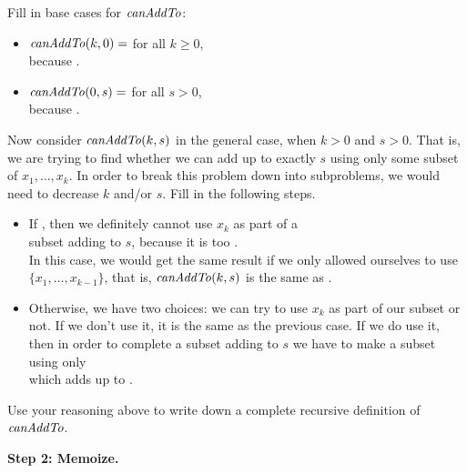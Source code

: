\documentclass{tufte-handout}
\begin{document}
\begin{questions}
  \item Fill in base cases for $\mathit{canAddTo}$:
    \begin{itemize}
    \item $\mathit{canAddTo}(k,0) = $ \blank for all $k \geq 0$, \\ because
      \blank.
    \item $\mathit{canAddTo}(0,s) = $ \blank for all $s > 0$, \\ because \blank.
    \end{itemize}
  \item Now consider $\mathit{canAddTo}(k,s)$ in the general case, when
    $k > 0$ and $s > 0$.  That is, we are trying to find whether we
    can add up to exactly $s$ using only some subset of
    $x_1, \dots, x_k$.  In order to break this problem down into
    subproblems, we would need to decrease $k$ and/or $s$.  Fill in
    the following steps.
    \begin{itemize}
    \item If \blank, then we definitely cannot use $x_k$ as part of a \\
      subset adding to $s$, because it is too \blank.  \\ In this
      case, we would get the same result if we only allowed ourselves
      to use $\{x_1, \dots, x_{k-1}\}$, that is, $\mathit{canAddTo}(k,s)$ is the
      same as \blank.
    \item Otherwise, we have two choices: we can try to use $x_k$ as
      part of our subset or not.  If we don't use it, it is the same
      as the previous case.  If we do use it, then in order to
      complete a subset adding to $s$ we have to make a subset using
      only \blank \\ which adds up to \blank.
    \end{itemize}
  \item Use your reasoning above to write down a complete recursive
    definition of $\mathit{canAddTo}$.
\end{questions}

\pause
\noindent
\textbf{Step 2: Memoize.}
\end{document}
